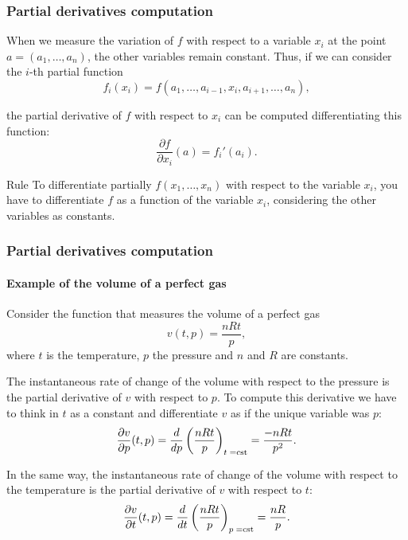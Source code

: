 \begin{frame}
\frametitle{Partial derivatives computation}
When we measure the variation of $f$ with respect to a variable $x_i$ at the point $a=(a_1,\ldots,a_n)$, the other variables remain constant.
Thus, if we can consider the $i$-th partial function
\[
f_i(x_i)=f(a_1,\ldots,a_{i-1},x_i,a_{i+1},\ldots,a_n),
\]

the partial derivative of $f$ with respect to $x_i$ can be computed differentiating this function:
\[
\frac{\partial f}{\partial x_i}(a)=f_i'(a_i).
\]

\begin{block}{Rule}
To differentiate partially $f(x_1,\ldots,x_n)$ with respect to the variable $x_i$, you have to differentiate $f$ as a function  of the variable $x_i$, considering the other variables as constants.
\end{block}
\end{frame}


\begin{frame}
\frametitle{Partial derivatives computation}
\framesubtitle{Example of the volume of a perfect gas}
Consider the function that measures the volume of a perfect gas
\[v(t,p)=\frac{nRt}{p},\]
where $t$ is the temperature, $p$ the pressure and $n$ and $R$ are constants.

The instantaneous rate of change of the volume with respect to the pressure is the partial derivative of $v$ with respect to $p$.
To compute this derivative we have to think in $t$ as a constant and differentiate $v$ as if the unique variable was $p$:
\[
\frac{\partial v}{\partial p}(t,p)=\frac{d}{dp}\left(\frac{nRt}{p}\right)_{\mbox{\scriptsize $t=$cst}}=\frac{-nRt}{p^2}.
\]

In the same way, the instantaneous rate of change of the volume with respect to the temperature is the partial derivative of $v$ with respect to $t$:
\[
\frac{\partial v}{\partial t}(t,p)=\frac{d}{dt}\left(\frac{nRt}{p}\right)_{\mbox{\scriptsize$p=$cst}}=\frac{nR}{p}.
\]
\end{frame}



